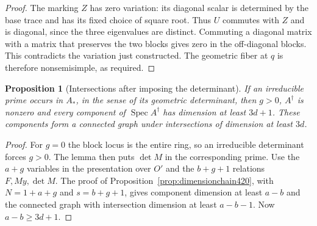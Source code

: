 \documentclass[a4paper,11pt]{article}
\newtheorem{proposition}{Proposition}[section]
\theoremstyle{definition}
\theoremstyle{remark}
\numberwithin{equation}{section}
\begin{document}
\begin{proof}
The marking \(Z\) has zero variation: its diagonal scalar is
determined by the base trace and has its fixed choice of square
root. Thus \(U\) commutes with \(Z\) and is diagonal, since
the three eigenvalues are distinct. Commuting a diagonal
matrix with a matrix that preserves the two blocks gives
zero in the off-diagonal blocks. This contradicts the
variation just constructed. The geometric fiber at \(q\)
is therefore nonsemisimple, as required.
\end{proof}

\begin{proposition}[Intersections after imposing the determinant]\leavevmode
\label{prop:incidencegraph422}
If an irreducible prime occurs in \(A_*\), in the sense of its
geometric determinant, then \(g>0\), \(A^\dagger\) is nonzero
and every component of \(\operatorname{Spec}A^\dagger\) has
dimension at least \(3d+1\). These components form a connected
graph under intersections of dimension at least \(3d\).
\end{proposition}
\begin{proof}
For \(g=0\) the block locus is the entire ring, so an
irreducible determinant forces \(g>0\). The lemma then
puts \(\det M\) in the corresponding prime. Use the
\(a+g\) variables in the presentation over \(O'\) and the
\(b+g+1\) relations \(F,My,\det M\). The proof of
Proposition~\ref{prop:dimensionchain420}, with
\(N=1+a+g\) and \(s=b+g+1\), gives component dimension at
least \(a-b\) and the connected graph with intersection
dimension at least \(a-b-1\). Now \(a-b\ge3d+1\).
\end{proof}
\end{document}
